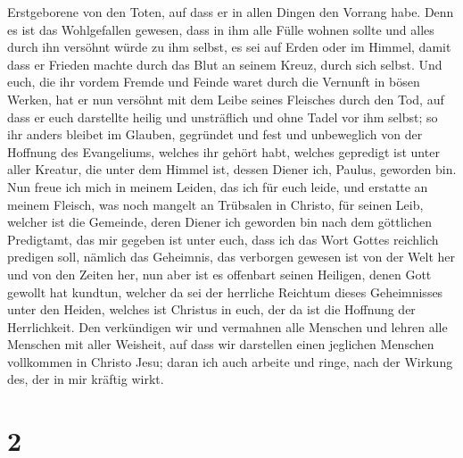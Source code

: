 Erstgeborene von den Toten, auf dass er in allen Dingen den Vorrang
habe.  Denn es ist das Wohlgefallen gewesen, dass in ihm
alle Fülle wohnen sollte  und alles durch ihn versöhnt
würde zu ihm selbst, es sei auf Erden oder im Himmel, damit dass er
Frieden machte durch das Blut an seinem Kreuz, durch sich selbst.
 Und euch, die ihr vordem Fremde und Feinde waret durch
die Vernunft in bösen Werken,  hat er nun versöhnt mit
dem Leibe seines Fleisches durch den Tod, auf dass er euch darstellte
heilig und unsträflich und ohne Tadel vor ihm selbst;  so
ihr anders bleibet im Glauben, gegründet und fest und unbeweglich von
der Hoffnung des Evangeliums, welches ihr gehört habt, welches gepredigt
ist unter aller Kreatur, die unter dem Himmel ist, dessen Diener ich,
Paulus, geworden bin.  Nun freue ich mich in meinem
Leiden, das ich für euch leide, und erstatte an meinem Fleisch, was noch
mangelt an Trübsalen in Christo, für seinen Leib, welcher ist die
Gemeinde,  deren Diener ich geworden bin nach dem
göttlichen Predigtamt, das mir gegeben ist unter euch, dass ich das Wort
Gottes reichlich predigen soll,  nämlich das Geheimnis,
das verborgen gewesen ist von der Welt her und von den Zeiten her, nun
aber ist es offenbart seinen Heiligen,  denen Gott
gewollt hat kundtun, welcher da sei der herrliche Reichtum dieses
Geheimnisses unter den Heiden, welches ist Christus in euch, der da ist
die Hoffnung der Herrlichkeit.  Den verkündigen wir und
vermahnen alle Menschen und lehren alle Menschen mit aller Weisheit, auf
dass wir darstellen einen jeglichen Menschen vollkommen in Christo Jesu;
 daran ich auch arbeite und ringe, nach der Wirkung des,
der in mir kräftig wirkt.

\hypertarget{section-1}{%
\section{2}\label{section-1}}

